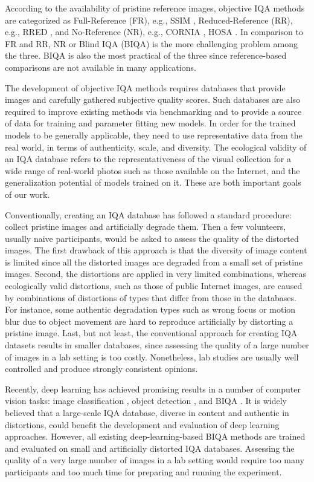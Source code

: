 \documentclass[10pt,journal,compsoc]{IEEEtran}
\begin{document}
According to the availability of pristine reference images, objective IQA methods are categorized as Full-Reference (FR), e.g., SSIM \cite{wang2004image}, Reduced-Reference (RR), e.g., RRED \cite{Soundararajan:2012}, and No-Reference (NR), e.g., CORNIA \cite{ye2012unsupervised},  HOSA \cite{hosa}. In comparison to FR and RR, NR or Blind IQA (BIQA) is the more challenging problem among the three. BIQA is also the most practical of the three since reference-based comparisons are not available in many applications.

The development of objective IQA methods requires data\-bases that provide images and carefully gathered subjective quality scores. Such databases are also required to improve existing methods via benchmarking and to provide a source of data for training and parameter fitting new models. In order for the trained models to be generally applicable, they need to use representative data from the real world, in terms of authenticity, scale, and diversity. The ecological validity of an IQA database refers to the representativeness of the visual collection for a wide range of real-world photos such as those available on the Internet, and the generalization potential of models trained on it. These are both important goals of our work.

Conventionally, creating an IQA database has followed a standard procedure: collect pristine images and artificially degrade them. Then a few volunteers, usually naive participants, would be asked to assess the quality of the distorted images. The first drawback of this approach is that the diversity of image content is limited since all the distorted images are degraded from a small set of pristine images. Second, the distortions are applied in very limited combinations, whereas ecologically valid distortions, such as those of public Internet images, are caused by combinations of distortions of types that differ from those in the databases. For instance, some authentic degradation types such as wrong focus or motion blur due to object movement are hard to reproduce artificially by distorting a pristine image. Last, but not least, the conventional approach for creating IQA datasets results in smaller databases, since assessing the quality of a large number of images in a lab setting is too costly. Nonetheless, lab studies are usually well controlled and produce strongly consistent opinions.

Recently, deep learning has achieved promising results in a number of computer vision tasks: image classification \cite{vgg} \cite{he2016deep}, object detection \cite{ren2015faster} \cite{redmon2016you},  and BIQA \cite{boss} \cite{conv1} \cite{bianco2018use}. It is widely believed that a large-scale IQA database, diverse in content and authentic in distortions, could benefit the development and evaluation of deep learning approaches. However, all existing deep-learning-based BIQA methods are trained and evaluated on small and artificially distorted IQA databases. Assessing the quality of a very large number of images in a lab setting would require too many participants and too much time for preparing and running the experiment.
\end{document}
